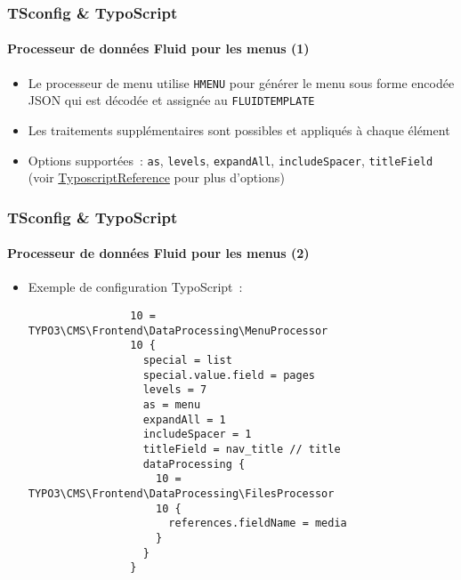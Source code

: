 \begin{frame}[fragile]
	\frametitle{TSconfig \& TypoScript}
	\framesubtitle{Processeur de données Fluid pour les menus (1)}

	\begin{itemize}
		\item Le processeur de menu utilise \texttt{HMENU} pour générer le menu sous forme
		 	encodée JSON qui est décodée et assignée au \texttt{FLUIDTEMPLATE}
		\item Les traitements supplémentaires sont possibles et appliqués à chaque élément
		\item Options supportées~: \texttt{as}, \texttt{levels}, \texttt{expandAll}, \texttt{includeSpacer},
			\texttt{titleField}
			(voir \href{https://docs.typo3.org/typo3cms/TyposcriptReference/ContentObjects/Hmenu/Index.html}{TyposcriptReference} pour plus d'options)
	\end{itemize}

\end{frame}

\begin{frame}[fragile]
	\frametitle{TSconfig \& TypoScript}
	\framesubtitle{Processeur de données Fluid pour les menus (2)}

	\lstset{basicstyle=\tiny\ttfamily}

	\begin{itemize}
		\item Exemple de configuration TypoScript~:

			\begin{lstlisting}
				10 = TYPO3\CMS\Frontend\DataProcessing\MenuProcessor
				10 {
				  special = list
				  special.value.field = pages
				  levels = 7
				  as = menu
				  expandAll = 1
				  includeSpacer = 1
				  titleField = nav_title // title
				  dataProcessing {
				    10 = TYPO3\CMS\Frontend\DataProcessing\FilesProcessor
				    10 {
				      references.fieldName = media
				    }
				  }
				}
			\end{lstlisting}

	\end{itemize}

\end{frame}

